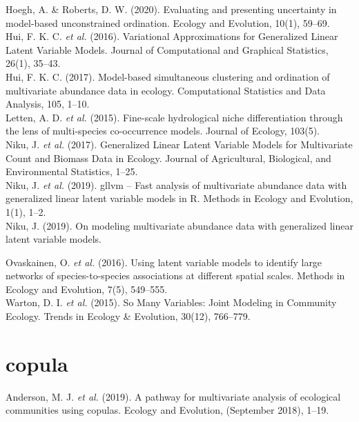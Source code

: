 \documentclass{article}
\begin{document}
Hoegh, A. \& Roberts, D. W. (2020). Evaluating and presenting uncertainty in model-based unconstrained ordination. Ecology and Evolution, 10(1), 59–69.\\

Hui, F. K. C. \textit{et al.} (2016). Variational Approximations for Generalized Linear Latent Variable Models. Journal of Computational and Graphical Statistics, 26(1), 35–43.\\ 

Hui, F. K. C. (2017). Model-based simultaneous clustering and ordination of multivariate abundance data in ecology. Computational Statistics and Data Analysis, 105, 1–10. \\

Letten, A. D. \textit{et al.} (2015). Fine-scale hydrological niche differentiation through the lens of multi-species co-occurrence models. Journal of Ecology, 103(5). \\ 

Niku, J. \textit{et al.} (2017). Generalized Linear Latent Variable Models for Multivariate Count and Biomass Data in Ecology. Journal of Agricultural, Biological, and Environmental Statistics, 1–25. \\

Niku, J. \textit{et al.} (2019). gllvm – Fast analysis of multivariate abundance data with generalized linear latent variable models in R. Methods in Ecology and Evolution, 1(1), 1–2. \\

Niku, J. (2019). On modeling multivariate abundance data with generalized linear latent variable models.

Ovaskainen, O. \textit{et al.} (2016). Using latent variable models to identify large networks of species-to-species associations at different spatial scales. Methods in Ecology and Evolution, 7(5), 549–555. \\

Warton, D. I. \textit{et al.} (2015). So Many Variables: Joint Modeling in Community Ecology. Trends in Ecology & Evolution, 30(12), 766–779. 

\section{copula}

Anderson, M. J. \textit{et al.} (2019). A pathway for multivariate analysis of ecological communities using copulas. Ecology and Evolution, (September 2018), 1–19.\\
\end{document}
